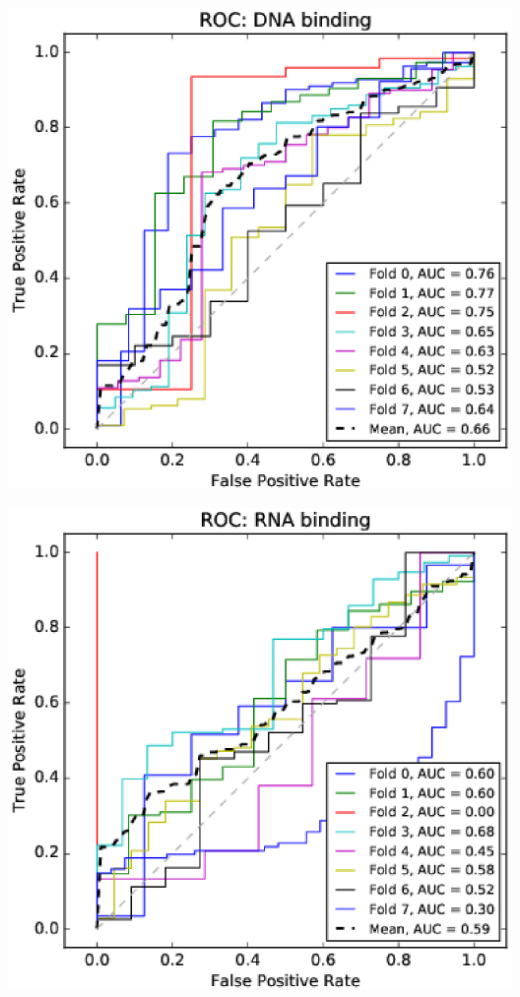 \documentclass[11pt,twoside,a4paper]{book}
\newenvironment{Figure}
  {\par\medskip\noindent\minipage{\linewidth}}
  {\endminipage\par\medskip}
\begin{document}
\begin{multicols}{2}
\begin{Figure}\begin{center}\includegraphics[width=\linewidth]{figures/roc_DNA_binding}\label{fig:roc_DNA_binding}\end{center}\end{Figure}
\begin{Figure}\begin{center}\includegraphics[width=\linewidth]{figures/roc_RNA_binding}\label{fig:roc_RNA_binding}\end{center}\end{Figure}

\end{multicols}
\end{document}
